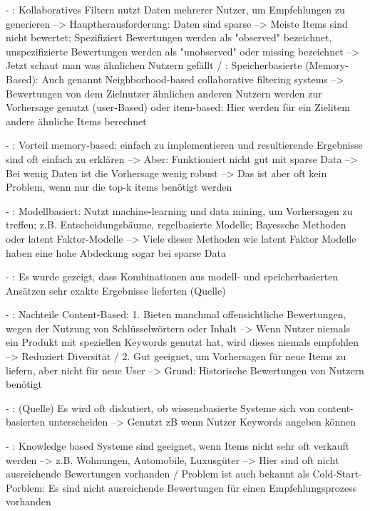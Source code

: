- \cite[S. 8]{recommenderSystems:2016}: Kollaboratives Filtern nutzt Daten mehrerer Nutzer, um Empfehlungen zu generieren --> Hauptherausforderung: Daten sind sparse --> Meiste Items sind nicht bewertet; Spezifiziert Bewertungen werden als "observed" bezeichnet, unspezifizierte Bewertungen werden als "unobserved" oder missing bezeichnet --> Jetzt schaut man was ähnlichen Nutzern gefällt / \cite[S. 9]{recommenderSystems:2016}: Speicherbasierte (Memory-Based): Auch genannt Neighborhood-based collaborative filtering systems --> Bewertungen von dem Zielnutzer ähnlichen anderen Nutzern werden zur Vorhersage genutzt (user-Based) oder item-based: Hier werden für ein Zielitem andere ähnliche Items berechnet

- \cite[S. 9]{recommenderSystems:2016}: Vorteil memory-based: einfach zu implementieren und resultierende Ergebnisse sind oft einfach zu erklären --> Aber: Funktioniert nicht gut mit sparse Data --> Bei wenig Daten ist die Vorhersage wenig robust --> Das ist aber oft kein Problem, wenn nur die top-k items benötigt werden

- \cite[S. 9]{recommenderSystems:2016}: Modellbasiert: Nutzt machine-learning und data mining, um Vorhersagen zu treffen; z.B. Entscheidungsbäume, regelbasierte Modelle; Bayessche Methoden oder latent Faktor-Modelle --> Viele dieser Methoden wie latent Faktor Modelle haben eine hohe Abdeckung sogar bei sparse Data

- \cite[S. 10]{recommenderSystems:2016}: Es wurde gezeigt, dass Kombinationen aus modell- und speicherbasierten Ansätzen sehr exakte Ergebnisse lieferten (Quelle)

- \cite[S. 15]{recommenderSystems:2016}: Nachteile Content-Based: 1. Bieten manchmal offensichtliche Bewertungen, wegen der Nutzung von Schlüsselwörtern oder Inhalt --> Wenn Nutzer niemals ein Produkt mit speziellen Keywords genutzt hat, wird dieses niemals empfohlen --> Reduziert Diversität / 2. Gut geeignet, um Vorhersagen für neue Items zu liefern, aber nicht für neue User --> Grund: Historische Bewertungen von Nutzern benötigt 

- \cite[S. 15]{recommenderSystems:2016}: (Quelle) Es wird oft diskutiert, ob wissensbasierte Systeme sich von content-basierten unterscheiden --> Genutzt zB wenn Nutzer Keywords angeben können

- \cite[S. 15]{recommenderSystems:2016}: Knowledge based Systeme sind geeignet, wenn Items nicht sehr oft verkauft werden --> z.B. Wohnungen, Automobile, Luxusgüter --> Hier sind oft nicht ausreichende Bewertungen vorhanden / Problem ist auch bekannt als Cold-Start-Porblem: Es sind nicht ausreichende Bewertungen für einen Empfehlungsprozess vorhanden 

